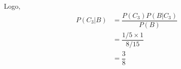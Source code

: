 \documentclass[14pt,aspectratio=1610]{beamer}
\begin{document}
\begin{frame}{}
\frametitle{}
\begin{block}{}
\justifying
Logo, 
\begin{align}
P(C_{3}|B)&=\dfrac{P(C_{3})P(B|C_{3})}{P(B)}\\
&=\dfrac{1/5 \times 1}{8/15}\\
&=\dfrac{3}{8}
\end{align}
\end{block}
\end{frame}

% 
% 
% 
% 
% 
% 
% 
% 
% 
% 
% 
% 
% 
% 
% 
% 
% 
% 
% 
% 
% 
% 
% 
% 
\end{document}
